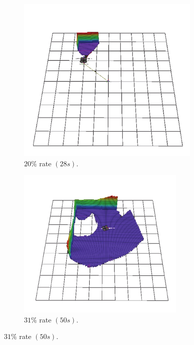 \documentclass[11pt,openany]{book}
\begin{document}
\begin{figure}[H]
\begin{subfigure}[H]{0.3\linewidth}
        \includegraphics[width=\linewidth]{assets/3_13_b.png}
        \caption{{$20\%$ rate $(28s).$}}
        \label{fig:3.13b}
    \end{subfigure}
    \begin{subfigure}[H]{0.3\linewidth}
        \centering
        \includegraphics[width=\linewidth]{assets/3_13_c.png}
        \caption{{$31\%$ rate $(50s).$}}

\end{subfigure}
\end{figure}
\end{document}

